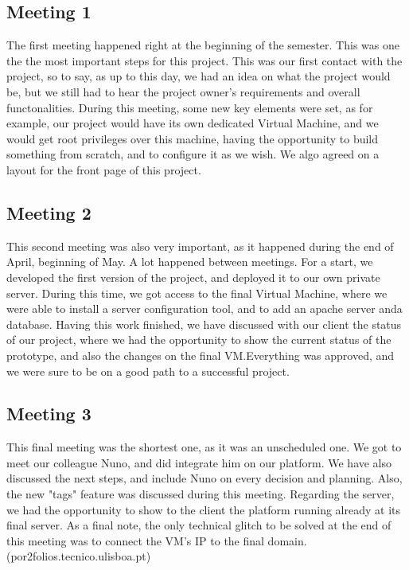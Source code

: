 \documentclass[a4paper,12pt,journal,twoside,compsoc]{PPIEEEtran}
\begin{document}
\subsection{Meeting 1}
The first meeting happened right at the beginning of the semester. This was one the the most important steps for this project. This was our first contact with the project, so to say, as up to this day, we had an idea on what the project would be, but we still had to hear the project owner's requirements and overall functonalities. During this meeting, some new key elements were set, as for example, our project would have its own dedicated Virtual Machine, and we would get root privileges over this machine, having the opportunity to build something from scratch, and to configure it as we wish.
	We algo agreed on a layout for the front page of this project.
	
\subsection{Meeting 2}
This second meeting was also very important, as it happened during the end of April, beginning of May. A lot happened between meetings. For a start, we developed the first version of the project, and deployed it to our own private server. During this time, we got access to the final Virtual Machine, where we were able to install a server configuration tool, and to add an apache server anda database.
Having this work finished, we have discussed with our client the status of our project, where we had the opportunity to show the current status of the prototype, and also the changes on the final VM.Everything was approved, and we were sure to be on a good path to a successful project.

\subsection{Meeting 3}
	This final meeting was the shortest one, as it was an unscheduled one. We got to meet our colleague Nuno, and did integrate him on our platform. We have also discussed the next steps, and include Nuno on every decision and planning. Also, the new "tags" feature was discussed during this meeting.
	Regarding the server, we had the opportunity to show to the client the platform running already at its final server.
	As a final note, the only technical glitch to be solved at the end of this meeting was to connect the VM's IP to the final domain.
	(por2folios.tecnico.ulisboa.pt)
\end{document}
